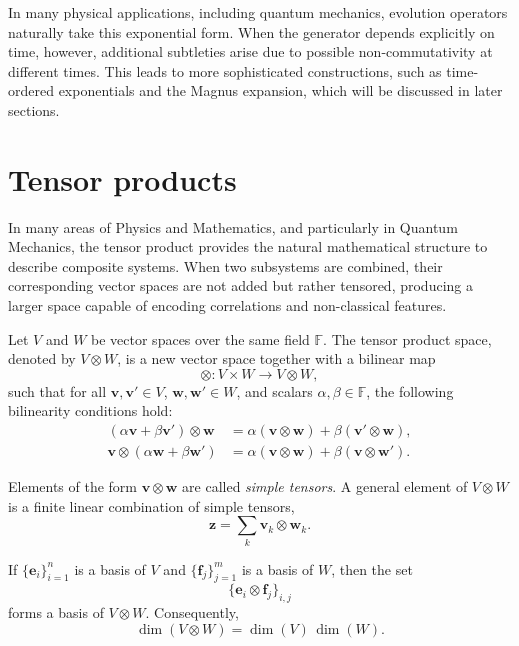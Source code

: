 In many physical applications, including quantum mechanics, evolution operators naturally take this exponential form. When the generator depends explicitly on time, however, additional subtleties arise due to possible non-commutativity at different times. This leads to more sophisticated constructions, such as time-ordered exponentials and the Magnus expansion, which will be discussed in later sections.

\section{Tensor products}
\label{sec:tensor_products}

In many areas of Physics and Mathematics, and particularly in Quantum Mechanics, the tensor product provides the natural mathematical structure to describe composite systems. When two subsystems are combined, their corresponding vector spaces are not added but rather tensored, producing a larger space capable of encoding correlations and non-classical features.

Let $V$ and $W$ be vector spaces over the same field $\mathbb{F}$. The tensor product space, denoted by $V \otimes W$, is a new vector space together with a bilinear map
\[
\otimes : V \times W \longrightarrow V \otimes W,
\]
such that for all $\mathbf{v}, \mathbf{v}' \in V$, $\mathbf{w}, \mathbf{w}' \in W$, and scalars $\alpha,\beta \in \mathbb{F}$, the following bilinearity conditions hold:
\begin{align*}
(\alpha \mathbf{v} + \beta \mathbf{v}') \otimes \mathbf{w}
&= \alpha (\mathbf{v} \otimes \mathbf{w}) + \beta (\mathbf{v}' \otimes \mathbf{w}), \\
\mathbf{v} \otimes (\alpha \mathbf{w} + \beta \mathbf{w}')
&= \alpha (\mathbf{v} \otimes \mathbf{w}) + \beta (\mathbf{v} \otimes \mathbf{w}').
\end{align*}

Elements of the form $\mathbf{v} \otimes \mathbf{w}$ are called \emph{simple tensors}. A general element of $V \otimes W$ is a finite linear combination of simple tensors,
\[
\mathbf{z} = \sum_{k} \mathbf{v}_k \otimes \mathbf{w}_k.
\]

If $\{\mathbf{e}_i\}_{i=1}^{n}$ is a basis of $V$ and $\{\mathbf{f}_j\}_{j=1}^{m}$ is a basis of $W$, then the set
\[
\{\mathbf{e}_i \otimes \mathbf{f}_j\}_{i,j}
\]
forms a basis of $V \otimes W$. Consequently,
\[
\dim(V \otimes W) = \dim(V)\,\dim(W).
\]

